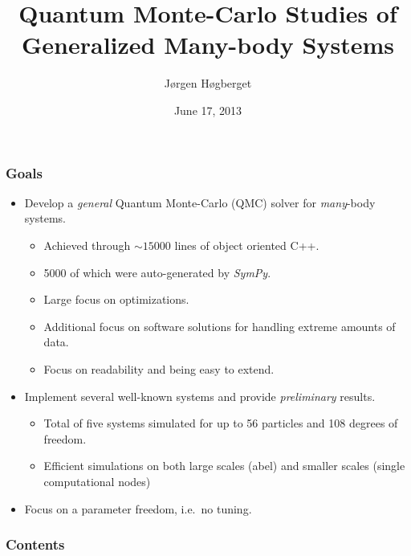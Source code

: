\documentclass{beamer}
\title[Master Presentation]{Quantum Monte-Carlo Studies of Generalized Many-body Systems}
\author{Jørgen Høgberget}
\date{June 17, 2013}
\begin{document}
\begin{frame}
\titlepage
\end{frame}

\begin{frame}
 \frametitle{Goals}
  \begin{itemize}
   \item Develop a \emph{general} Quantum Monte-Carlo (QMC) solver for \emph{many}-body systems. 
   \begin{itemize}
      \item Achieved through $\sim 15000$ lines of object oriented C++.
      \item 5000 of which were auto-generated by \textit{SymPy}.
      \item Large focus on optimizations. 
      \item Additional focus on software solutions for handling extreme amounts of data.
      \item Focus on readability and being easy to extend. 
   \end{itemize}
  \end{itemize}
  \begin{itemize}
   \pause \item Implement several well-known systems and provide \emph{preliminary} results.
   \begin{itemize}
      \item Total of five systems simulated for up to 56 particles and 108 degrees of freedom.
      \item Efficient simulations on both large scales (abel) and smaller scales (single computational nodes)
   \end{itemize}
   \item Focus on a parameter freedom, i.e.~no tuning.
  \end{itemize}
  
\end{frame}

\begin{frame}
 \frametitle{Contents}
 \tableofcontents[hideallsubsections]
\end{frame}


% 


\end{document}
